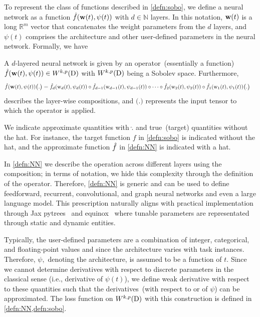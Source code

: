 To represent the class of functions described in \cref{defn:sobo}, we define a neural network as a function  $\hat{f}(\boldsymbol{\mathrm{w}}(t),  \psi(t) )$ with $d \in \mathbb{N}$ layers. In this notation, $\boldsymbol{\mathrm{w}}(t)$ is a long $\mathbb{R}^{m}$ vector that concatenates the weight parameters from the $d$ layers, and $\psi(t)$  comprises  the architecture and other user-defined parameters in the neural network.  Formally, we have
\begin{definition} \label{defn:NN}
A $d$-layered neural network is given by an operator~(essentially a function) 
$\hat{f}(\boldsymbol{\mathrm{w}}(t), \psi(t) )\in W^{k,p}(\mathrm{D})$ with $W^{k,p}(\mathrm{D})$ being a Sobolev space. Furthermore, 
\begin{align}
  \hat{f}(\boldsymbol{\mathrm{w}}(t), \psi(t)) \big( . \big) & = \hat{f}_{d}(\mathrm{w}_{d}(t), \psi_{d}(t))\circ \hat{f}_{d-1}(\mathrm{w}_{d-1}(t), \psi_{d-1}(t))\circ \cdots \circ \hat{f}_{2}(\mathrm{w}_{2}(t), \psi_{2}(t))\circ \hat{f}_{1}(\mathrm{w}_{1}(t), \psi_{1}(t)) \big( . \big)
\end{align}
describes the layer-wise compositions, and $\big( . \big)$ represents the input tensor to which the operator is applied.
\end{definition}
\begin{remark}
    We indicate approximate quantities with $\hat{.}$ and true~(target) quantities without the hat. For instance, the target function $f$ in \cref{defn:sobo} is indicated without the hat, and the approximate function $\hat{f}$ in \cref{defn:NN} is indicated with a hat.
\end{remark}
\begin{remark}
    In \cref{defn:NN} we describe the operation across different layers using the composition; in terms of notation, we hide this complexity through the definition of the operator. Therefore, \cref{defn:NN} is generic and  can be used to define feedforward, recurrent, convolutional, and graph  neural networks and even a large language model. This prescription naturally aligns with practical implementation through Jax pytrees~\cite{jax} and equinox~\cite{kidger2021equinox} where tunable parameters are representated through static and dynamic entities.
\end{remark}
Typically, the user-defined parameters are a combination of integer, categorical, and floating-point values and since the architecture varies with task instances. Therefore, $\psi,$ denoting the architecture, is assumed to be a function of $t.$ Since we cannot determine derivatives with respect to discrete parameters in the classical sense (i.e., derivative of $\psi(t)$), we define weak derivative with respect to these quantities such that the derivatives~(with respect to or of $\psi$) can be approximated. The loss function on $W^{k,p}(\mathrm{D})$ with this construction is defined in \cref{defn:NN,defn:sobo}. 
